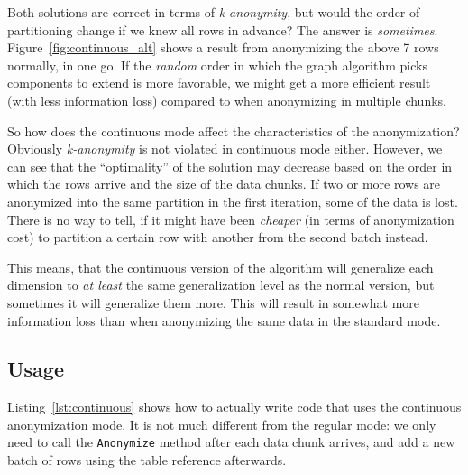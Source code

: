 Both solutions are correct in terms of \emph{k-anonymity}, but would the order of partitioning change if we knew all rows in advance? The answer is \emph{sometimes}. Figure~\ref{fig:continuous_alt} shows a result from anonymizing the above 7 rows normally, in one go. If the \emph{random} order in which the graph algorithm picks components to extend is more favorable, we might get a more efficient result (with less information loss) compared to when anonymizing in multiple chunks.



So how does the continuous mode affect the characteristics of the anonymization? Obviously \emph{k-anonymity} is not violated in continuous mode either. However, we can see that the ``optimality'' of the solution may decrease based on the order in which the rows arrive and the size of the data chunks. If two or more rows are anonymized into the same partition in the first iteration, some of the data is lost. There is no way to tell, if it might have been \emph{cheaper} (in terms of anonymization cost) to partition a certain row with another from the second batch instead.

This means, that the continuous version of the algorithm will generalize each dimension to \emph{at least} the same generalization level as the normal version, but sometimes it will generalize them more. This will result in somewhat more information loss than when anonymizing the same data in the standard mode.


\subsection{Usage}

Listing~\ref{lst:continuous} shows how to actually write code that uses the continuous anonymization mode. It is not much different from the regular mode: we only need to call the \texttt{Anonymize} method after each data chunk arrives, and add a new batch of rows using the table reference afterwards.



